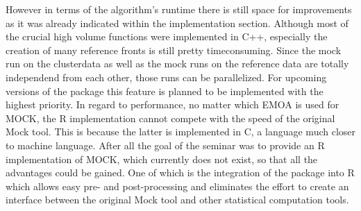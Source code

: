 \documentclass[parskip=half,DIV=14]{scrartcl}\usepackage[]{graphicx}\usepackage[]{color}
\begin{document}
However in terms of the algorithm's runtime there is still space for improvements as it was already indicated within the implementation section. Although most of the crucial high volume functions were implemented in C++, especially the creation of many reference fronts is still pretty timeconsuming. Since the mock run on the clusterdata as well as the mock runs on the reference data are totally independend from each other, those runs can be parallelized. For upcoming versions of the package this feature is planned to be implemented with the highest priority. In regard to performance, no matter which EMOA is used for MOCK, the R implementation cannot compete with the speed of the original Mock tool. This is because the latter is implemented in C, a language much closer to machine language. After all the goal of the seminar was to provide an R implementation of MOCK, which currently does not exist, so that all the advantages could be gained. One of which is the integration of the package into R which allows easy pre- and post-processing and eliminates the effort to create an interface between the original Mock tool and other statistical computation tools.
\printbibliography
\end{document}
